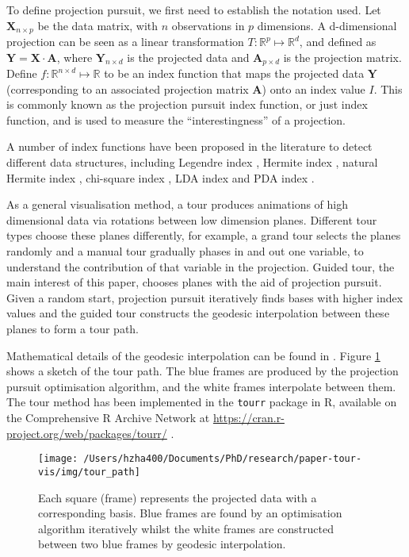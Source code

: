 \documentclass[12pt]{article}
\begin{document}
To define projection pursuit, we first need to establish the notation used. Let \(\mathbf{X}_{n \times p}\) be the data matrix, with \(n\) observations in \(p\) dimensions. A d-dimensional projection can be seen as a linear transformation \(T: \mathbb{R}^p \mapsto \mathbb{R}^d\), and defined as \(\mathbf{Y} = \mathbf{X} \cdot \mathbf{A}\), where \(\mathbf{Y}_{n \times d}\) is the projected data and \(\mathbf{A}_{p\times d}\) is the projection matrix. Define \(f: \mathbb{R}^{n \times d} \mapsto \mathbb{R}\) to be an index function that maps the projected data \(\mathbf{Y}\) (corresponding to an associated projection matrix \(\mathbf{A}\)) onto an index value \(I\). This is commonly known as the projection pursuit index function, or just index function, and is used to measure the ``interestingness'' of a projection.

A number of index functions have been proposed in the literature to detect different data structures, including Legendre index \citep{friedman1974projection}, Hermite index \citep{hall1989polynomial}, natural Hermite index \citep{cook1993projection}, chi-square index \citep{posse1995projection}, LDA index \citep{lee2005projection} and PDA index \citep{lee2010projection}.

As a general visualisation method, a tour produces animations of high dimensional data via rotations between low dimension planes. Different tour types choose these planes differently, for example, a grand tour\citep{cook2008grand} selects the planes randomly and a manual tour\citep{cook1997manual} gradually phases in and out one variable, to understand the contribution of that variable in the projection. Guided tour, the main interest of this paper, chooses planes with the aid of projection pursuit. Given a random start, projection pursuit iteratively finds bases with higher index values and the guided tour constructs the geodesic interpolation between these planes to form a tour path.

Mathematical details of the geodesic interpolation can be found in \citet{buja2005computational}. Figure \ref{fig:tour-path} shows a sketch of the tour path. The blue frames are produced by the projection pursuit optimisation algorithm, and the white frames interpolate between them. The tour method has been implemented in the \texttt{tourr} package in R, available on the Comprehensive R Archive Network at \url{https://cran.r-project.org/web/packages/tourr/} \citep{wickham2011tourrpackage}.

\begin{figure}

{\centering \texttt{[image: /Users/hzha400/Documents/PhD/research/paper-tour-vis/img/tour\_path]} 

}

\caption{Each square (frame) represents the projected data with a corresponding basis. Blue frames are found by an optimisation algorithm iteratively whilst the white frames are constructed between two blue frames by geodesic interpolation.}\label{fig:tour-path}
\end{figure}
\end{document}
